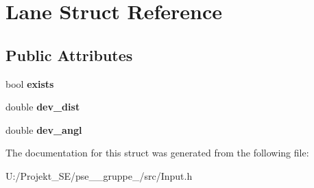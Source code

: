 \hypertarget{struct_lane}{}\section{Lane Struct Reference}
\label{struct_lane}
\subsection*{Public Attributes}
\begin{DoxyCompactItemize}
\item 
\mbox{\label{struct_lane_a1aa9ff32ad5284d40b8ab316377b6f63}} 
bool {\bfseries exists}
\item 
\mbox{\label{struct_lane_a58cc3e564bd3e37c8748e3bbdc4cd712}} 
double {\bfseries dev\+\_\+dist}
\item 
\mbox{\label{struct_lane_ae7a9c69dd45fc8093182ceb3217a98d0}} 
double {\bfseries dev\+\_\+angl}
\end{DoxyCompactItemize}


The documentation for this struct was generated from the following file\+:\begin{DoxyCompactItemize}
\item 
U\+:/\+Projekt\+\_\+\+S\+E/pse\+\_\+\_\+gruppe\+\_/src/Input.\+h\end{DoxyCompactItemize}
